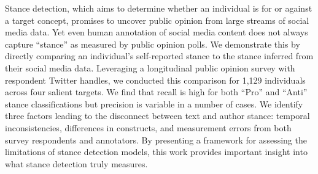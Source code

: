 Stance detection, which aims to determine whether an individual is for or against a target concept, promises to uncover public opinion from large streams of social media data. Yet even human annotation of social media content does not always capture ``stance'' as measured by public opinion polls. We demonstrate this by directly comparing an individual's self-reported stance to the stance inferred from their social media data. Leveraging a longitudinal public opinion survey with respondent Twitter handles, we conducted this comparison for 1,129 individuals across four salient targets. We find that recall is high for both ``Pro'' and ``Anti'' stance classifications but precision is variable in a number of cases. We identify three factors leading to the disconnect between text and author stance: temporal inconsistencies, differences in constructs, and measurement errors from both survey respondents and annotators. By presenting a framework for assessing the limitations of stance detection  models, this work provides important insight into what stance detection truly measures.
